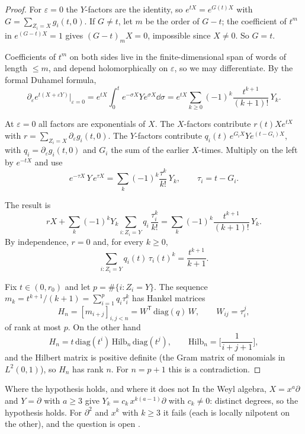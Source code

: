 \begin{proof}
For $\varepsilon=0$ the $Y$-factors are the identity, so $e^{tX}=e^{G(t)X}$ with $G=\sum_{Z_i=X}g_i(t,0)$. If $G\ne t$, let $m$ be the order of $G-t$; the coefficient of $t^m$ in $e^{(G-t)X}=1$ gives $(G-t)_mX=0$, impossible since $X\ne0$. So $G=t$.

Coefficients of $t^m$ on both sides live in the finite-dimensional span of words of length $\le m$, and depend holomorphically on $\varepsilon$, so we may differentiate. By the formal Duhamel formula,
\[
\partial_\varepsilon e^{t(X+\varepsilon Y)}\Big|_{\varepsilon=0}=e^{tX}\int_0^te^{-\sigma X}Ye^{\sigma X}\dd\sigma=e^{tX}\sum_{k\ge0}(-1)^k\frac{t^{k+1}}{(k+1)!}\,Y_k .
\]

At $\varepsilon=0$ all factors are exponentials of $X$. The $X$-factors contribute $r(t)Xe^{tX}$ with $r=\sum_{Z_i=X}\partial_\varepsilon g_i(t,0)$. The $Y$-factors contribute $q_i(t)\,e^{G_iX}Ye^{(t-G_i)X}$, with $q_i=\partial_\varepsilon g_i(t,0)$ and $G_i$ the sum of the earlier $X$-times. Multiply on the left by $e^{-tX}$ and use
\[
e^{-\tau X}\,Y\,e^{\tau X}=\sum_k(-1)^k\frac{\tau^k}{k!}\,Y_k,\qquad \tau_i=t-G_i .
\]

The result is
\[
rX+\sum_k(-1)^kY_k\sum_{i:Z_i=Y}q_i\,\frac{\tau_i^k}{k!}=\sum_k(-1)^k\frac{t^{k+1}}{(k+1)!}\,Y_k .
\]
By independence, $r=0$ and, for every $k\ge0$,
\[
\sum_{i:Z_i=Y}q_i(t)\,\tau_i(t)^k=\frac{t^{k+1}}{k+1}.
\]

Fix $t\in(0,r_0)$ and let $p=\#\{i:Z_i=Y\}$. The sequence $m_k=t^{k+1}/(k+1)=\sum_{i=1}^pq_i\tau_i^k$ has Hankel matrices
\[
H_n=[m_{i+j}]_{i,j<n}=W^{\mathsf T}\,\mathrm{diag}(q)\,W,\qquad W_{ij}=\tau_i^j,
\]
of rank at most $p$. On the other hand
\[
H_n=t\,\mathrm{diag}(t^i)\,\mathrm{Hilb}_n\,\mathrm{diag}(t^j),\qquad \mathrm{Hilb}_n=\Big[\frac1{i+j+1}\Big],
\]
and the Hilbert matrix is positive definite (the Gram matrix of monomials in $L^2(0,1)$), so $H_n$ has rank $n$. For $n=p+1$ this is a contradiction.

\end{proof}

\begin{example}{Where the hypothesis holds, and where it does not}
In the Weyl algebra, $X=x^a\partial$ and $Y=\partial$ with $a\ge3$ give $Y_k=c_k\,x^{k(a-1)}\partial$ with $c_k\ne0$: distinct degrees, so the hypothesis holds. For $\partial^2$ and $x^k$ with $k\ge3$ it fails (each is locally nilpotent on the other), and the question is open .
\end{example}
